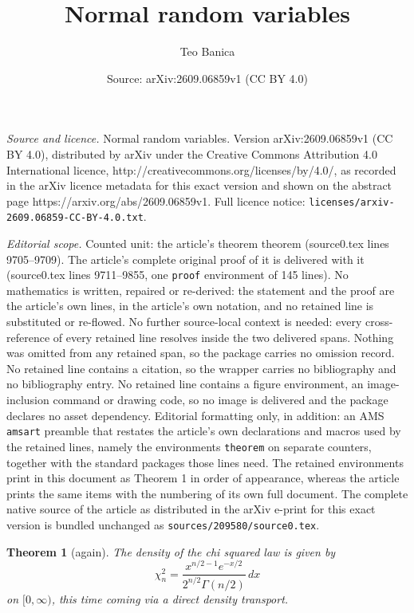 \documentclass[10pt,a4paper]{amsart}
\title{Normal random variables}
\author{Teo Banica}
\date{Source: arXiv:2609.06859v1 (CC BY 4.0)}
\newtheorem{theorem}{Theorem}
\begin{document}
\maketitle

\noindent\emph{Source and licence.} Normal random variables. Version arXiv:2609.06859v1 (CC BY 4.0), distributed by arXiv under the Creative Commons Attribution 4.0 International licence, http://creativecommons.org/licenses/by/4.0/, as recorded in the arXiv licence metadata for this exact version and shown on the abstract page https://arxiv.org/abs/2609.06859v1. Full licence notice: \texttt{licenses/arxiv-2609.06859-CC-BY-4.0.txt}.\par\smallskip

\noindent\textit{Editorial scope.} Counted unit: the article's theorem theorem (source0.tex lines 9705--9709). The article's complete original proof of it is delivered with it (source0.tex lines 9711--9855, one \texttt{proof} environment of 145 lines). No mathematics is written, repaired or re-derived: the statement and the proof are the article's own lines, in the article's own notation, and no retained line is substituted or re-flowed.  No further source-local context is needed: every cross-reference of every retained line resolves inside the two delivered spans.  Nothing was omitted from any retained span, so the package carries no omission record.  No retained line contains a citation, so the wrapper carries no bibliography and no bibliography entry.  No retained line contains a figure environment, an image-inclusion command or drawing code, so no image is delivered and the package declares no asset dependency.  Editorial formatting only, in addition: an AMS \texttt{amsart} preamble that restates the article's own declarations and macros used by the retained lines, namely the environments \texttt{theorem} on separate counters, together with the standard packages those lines need.  The retained environments print in this document as Theorem 1 in order of appearance, whereas the article prints the same items with the numbering of its own full document.  The complete native source of the article as distributed in the arXiv e-print for this exact version is bundled unchanged as \texttt{sources/209580/source0.tex}.
\begin{theorem}[again]
The density of the chi squared law is given by
$$\chi_n^2=\frac{x^{n/2-1}e^{-x/2}}{2^{n/2}\Gamma(n/2)}\,dx$$
on $[0,\infty)$, this time coming via a direct density transport.
\end{theorem}
\end{document}
